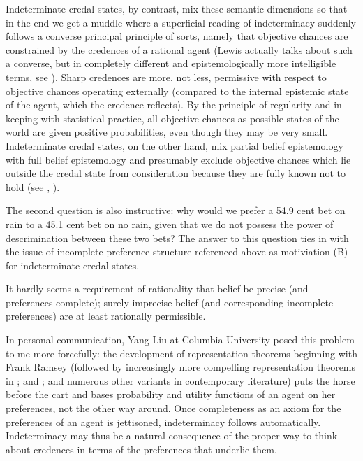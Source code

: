 Indeterminate credal states, by contrast, mix these semantic dimensions so that in the end we get a muddle where a superficial reading of indeterminacy suddenly follows a converse principal principle of sorts, namely that objective chances are constrained by the credences of a rational agent (Lewis actually talks about such a converse, but in completely different and epistemologically more intelligible terms, see ). Sharp credences are more, not less, permissive with respect to objective chances operating externally (compared to the internal epistemic state of the agent, which the credence reflects). By the principle of regularity and in keeping with statistical practice, all objective chances as possible states of the world are given positive probabilities, even though they may be very small. Indeterminate credal states, on the other hand, mix partial belief epistemology with full belief epistemology and presumably exclude objective chances which lie outside the credal state from consideration because they are fully known not to hold (see , ).

The second question is also instructive: why would we prefer a 54.9 cent bet on rain to a 45.1 cent bet on no rain, given that we do not possess the power of descrimination between these two bets? The answer to this question ties in with the issue of incomplete preference structure referenced above as motiviation (B) for indeterminate credal states.

\begin{quotex}
  It hardly seems a requirement of rationality that belief be precise (and preferences complete); surely imprecise belief (and corresponding incomplete preferences) are at least rationally permissible. 
\end{quotex}

In personal communication, Yang Liu at Columbia University posed this problem to me more forcefully: the development of representation theorems beginning with Frank Ramsey (followed by increasingly more compelling representation theorems in ; and ; and numerous other variants in contemporary literature) puts the horse before the cart and bases probability and utility functions of an agent on her preferences, not the other way around. Once completeness as an axiom for the preferences of an agent is jettisoned, indeterminacy follows automatically. Indeterminacy may thus be a natural consequence of the proper way to think about credences in terms of the preferences that underlie them.

